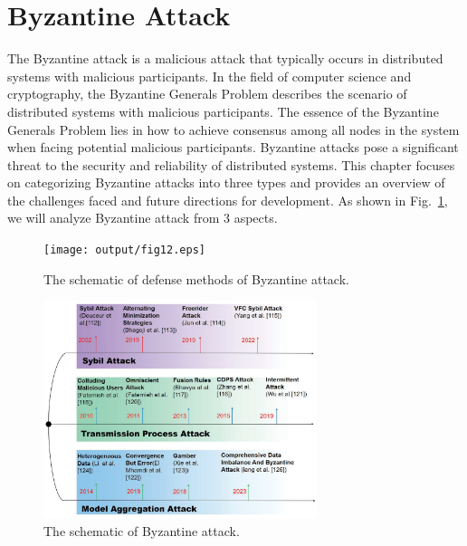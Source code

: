 \section{Byzantine Attack}  
The Byzantine attack is a malicious attack that
typically occurs in distributed systems with malicious
participants. In the field of computer science and cryptography,
the Byzantine Generals Problem describes the scenario
of distributed systems with malicious participants. The
essence of the Byzantine Generals Problem lies in how
to achieve consensus among all nodes in the system
when facing potential malicious participants. Byzantine
attacks pose a significant threat to the security and
reliability of distributed systems. This chapter focuses
on categorizing Byzantine attacks into three types and
provides an overview of the challenges faced and future
directions for development. As shown in Fig.~\ref{fig13}, we will
analyze Byzantine attack from 3 aspects.  

\begin{figure}[htbp]
	\centering
	\begin{minipage}{0.49\linewidth}
		\centering
		\texttt{[image: output/fig12.eps]}
		\caption{The schematic of defense methods of Byzantine attack.}
		\label{fig12}
	\end{minipage}
	\begin{minipage}{0.49\linewidth}
		\centering
		\includegraphics[width=1.0\linewidth,height=2.5in]{output/fig13.eps}
		\caption{The schematic of Byzantine attack.}
		\label{fig13}
	\end{minipage}
\end{figure}



